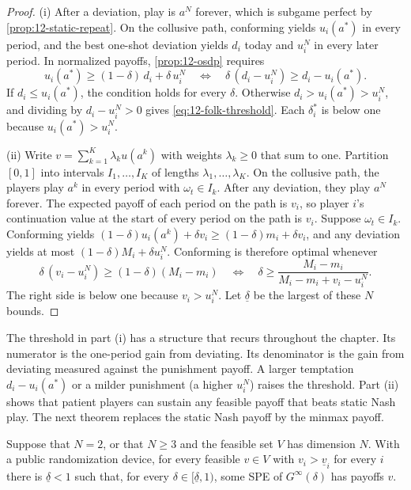 \begin{proof}
(i) After a deviation, play is $a^N$ forever, which is subgame perfect by \cref{prop:12-static-repeat}. On the
collusive path, conforming yields $u_i(a^*)$ in every period, and the best one-shot deviation yields $d_i$ today and
$u_i^N$ in every later period. In normalized payoffs, \cref{prop:12-osdp} requires
\begin{equation*}
u_i(a^*) \ge (1 - \delta)\,d_i + \delta\,u_i^N
\quad\Longleftrightarrow\quad
\delta\,(d_i - u_i^N) \ge d_i - u_i(a^*) .
\end{equation*}
If $d_i \le u_i(a^*)$, the condition holds for every $\delta$. Otherwise $d_i > u_i(a^*) > u_i^N$, and dividing by
$d_i - u_i^N > 0$ gives \eqref{eq:12-folk-threshold}. Each $\delta_i^*$ is below one because $u_i(a^*) > u_i^N$.

(ii) Write $v = \sum_{k=1}^{K}\lambda_k u(a^k)$ with weights $\lambda_k \ge 0$ that sum to one. Partition $[0, 1]$
into intervals $I_1, \dots, I_K$ of lengths $\lambda_1, \dots, \lambda_K$. On the collusive path, the players play
$a^k$ in every period with $\omega_t \in I_k$. After any deviation, they play $a^N$ forever. The expected payoff of
each period on the path is $v_i$, so player $i$'s continuation value at the start of every period on the path is
$v_i$. Suppose $\omega_t \in I_k$. Conforming yields $(1 - \delta)u_i(a^k) + \delta v_i \ge (1 - \delta)m_i +
\delta v_i$, and any deviation yields at most $(1 - \delta)M_i + \delta u_i^N$. Conforming is therefore optimal
whenever
\begin{equation*}
\delta\,(v_i - u_i^N) \ge (1 - \delta)(M_i - m_i)
\quad\Longleftrightarrow\quad
\delta \ge \frac{M_i - m_i}{M_i - m_i + v_i - u_i^N} .
\end{equation*}
The right side is below one because $v_i > u_i^N$. Let $\underline\delta$ be the largest of these $N$ bounds.
\end{proof}

The threshold in part (i) has a structure that recurs throughout the chapter. Its numerator is the one-period gain
from deviating. Its denominator is the gain from deviating measured against the punishment payoff. A larger
temptation $d_i - u_i(a^*)$ or a milder punishment (a higher $u_i^N$) raises the threshold. Part (ii) shows that
patient players can sustain any feasible payoff that beats static Nash play. The next theorem replaces the static
Nash payoff by the minmax payoff.

\begin{theorem}\label{thm:12-folk-fm}
Suppose that $N = 2$, or that $N \ge 3$ and the feasible set $V$ has dimension $N$. With a public randomization
device, for every feasible $v \in V$ with $v_i > \underline v_i$ for every $i$ there is $\underline\delta < 1$ such
that, for every $\delta \in [\underline\delta, 1)$, some SPE of $G^\infty(\delta)$ has payoffs $v$.
\end{theorem}

